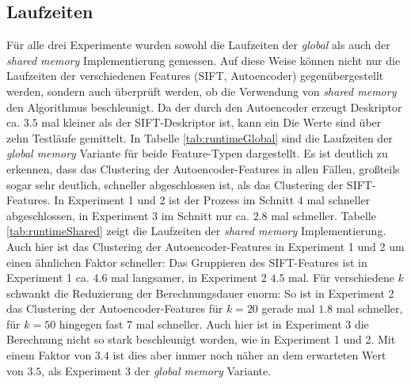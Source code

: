 \subsection{Laufzeiten}

Für alle drei Experimente wurden sowohl die Laufzeiten der \textit{global} als auch der \textit{shared memory} Implementierung gemessen. Auf diese Weise können nicht nur die Laufzeiten der verschiedenen Features (SIFT, Autoencoder) gegenübergestellt werden, sondern auch überprüft werden, ob die Verwendung von \textit{shared memory} den Algorithmus beschleunigt. Da der durch den Autoencoder erzeugt Deskriptor ca. $3.5$ mal kleiner als der SIFT-Deskriptor ist, kann ein  Die Werte sind über zehn Testläufe gemittelt. \newline
In Tabelle \ref{tab:runtimeGlobal} sind die Laufzeiten der \textit{global memory} Variante für beide Feature-Typen dargestellt. Es ist deutlich zu erkennen, dass das Clustering der Autoencoder-Features in allen Fällen, großteils sogar sehr deutlich, schneller abgeschlossen ist, als das Clustering der SIFT-Features. In Experiment 1 und 2 ist der Prozess im Schnitt $4$ mal schneller abgeschlossen, in Experiment 3 im Schnitt nur ca. $2.8$ mal schneller.
Tabelle \ref{tab:runtimeShared} zeigt die Laufzeiten der \textit{shared memory} Implementierung. Auch hier ist das Clustering der Autoencoder-Features in Experiment 1 und 2 um einen ähnlichen Faktor schneller: Das Gruppieren des SIFT-Features ist in Experiment 1 ca. $4.6$ mal langsamer, in Experiment 2 $4.5$ mal. Für verschiedene $k$ schwankt die Reduzierung der Berechnungsdauer enorm: So ist in Experiment 2 das Clustering der Autoencoder-Features für $k=20$ gerade mal $1.8$ mal schneller, für $k=50$ hingegen fast $7$ mal schneller. Auch hier ist in Experiment 3 die Berechnung nicht so stark beschleunigt worden, wie in Experiment 1 und 2. Mit einem Faktor von $3.4$ ist dies aber immer noch näher an dem erwarteten Wert von $3.5$, als Experiment 3 der \textit{global memory} Variante.


